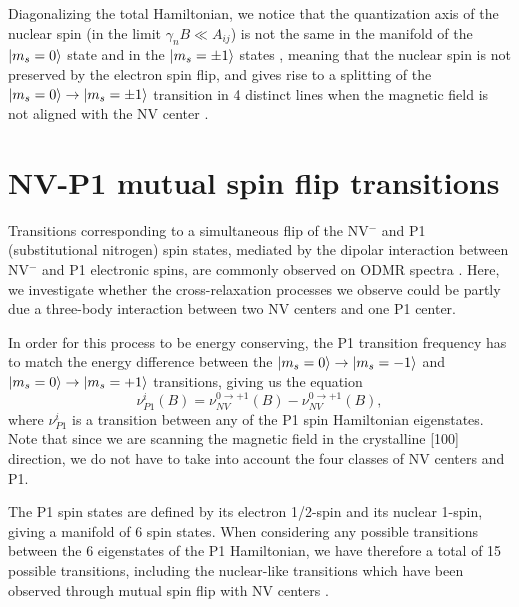 \documentclass[9pt,twocolumn,twoside]{revtex4-1}
\begin{document}
Diagonalizing the total Hamiltonian, we notice that the quantization axis of the nuclear spin (in the limit $\gamma_{n} B \ll A_{ij}$) is not the same in the manifold of the $\ket{m_s=0}$ state and in the $\ket{m_s=\pm 1}$ states \citep{alvarez_local_2015}, meaning that the nuclear spin is not preserved by the electron spin flip, and gives rise to a splitting of the $\ket{m_s=0} \to \ket{m_s=\pm 1}$ transition in 4 distinct lines when the magnetic field is not aligned with the NV center \citep{jiang2018estimation}.

\section{NV-P1 mutual spin flip transitions}

Transitions corresponding to a simultaneous flip of the NV$^-$ and P1 (substitutional nitrogen) spin states, mediated by the dipolar interaction between NV$^-$ and P1 electronic spins, are commonly observed on ODMR spectra \citep{simanovskaia_sidebands_2013, kamp2018continuous, alfasi2019detection, lazda2020cross}. Here, we investigate whether the cross-relaxation processes we observe could be partly due a three-body interaction between two NV centers and one P1 center.

In order for this process to be energy conserving, the P1 transition frequency has to match the energy difference between the $\ket{m_s=0} \to \ket{m_s=-1}$ and $\ket{m_s=0} \to \ket{m_s=+1}$ transitions, giving us the equation \begin{equation}
\label{eq_P1}
\nu^i_{P1}(B)=\nu^{0 \to +1}_{NV}(B)-\nu^{0 \to +1}_{NV}(B),
\end{equation}
where $\nu^i_{P1}$ is a transition between any of the P1 spin Hamiltonian eigenstates. Note that since we are scanning the magnetic field in the crystalline [100] direction, we do not have to take into account the four classes of NV centers and P1.

The P1 spin states are defined by its electron 1/2-spin and its nuclear 1-spin, giving a manifold of 6 spin states. When considering any possible transitions between the 6 eigenstates of the P1 Hamiltonian, we have therefore a total of 15 possible transitions, including the nuclear-like transitions which have been observed through mutual spin flip with NV centers \citep{alfasi2019detection}. 

\end{document}
